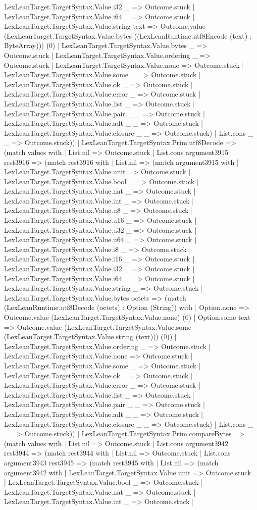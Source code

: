 \documentclass[11pt]{article}
\begin{document}
LexLeanTarget.TargetSyntax.Value.i32 \_ => Outcome.stuck | LexLeanTarget.TargetSyntax.Value.i64 \_ => Outcome.stuck | LexLeanTarget.TargetSyntax.Value.string text => Outcome.value (LexLeanTarget.TargetSyntax.Value.bytes ((LexLeanRuntime.utf8Encode (text) : ByteArray))) (0) | LexLeanTarget.TargetSyntax.Value.bytes \_ => Outcome.stuck | LexLeanTarget.TargetSyntax.Value.ordering \_ => Outcome.stuck | LexLeanTarget.TargetSyntax.Value.none => Outcome.stuck | LexLeanTarget.TargetSyntax.Value.some \_ => Outcome.stuck | LexLeanTarget.TargetSyntax.Value.ok \_ => Outcome.stuck | LexLeanTarget.TargetSyntax.Value.error \_ => Outcome.stuck | LexLeanTarget.TargetSyntax.Value.list \_ => Outcome.stuck | LexLeanTarget.TargetSyntax.Value.pair \_ \_ => Outcome.stuck | LexLeanTarget.TargetSyntax.Value.adt \_ \_ => Outcome.stuck | LexLeanTarget.TargetSyntax.Value.closure \_ \_ => Outcome.stuck) | List.cons \_ \_ => Outcome.stuck)) | LexLeanTarget.TargetSyntax.Prim.utf8Decode => (match values with | List.nil => Outcome.stuck | List.cons argument3915 rest3916 => (match rest3916 with | List.nil => (match argument3915 with | LexLeanTarget.TargetSyntax.Value.unit => Outcome.stuck | LexLeanTarget.TargetSyntax.Value.bool \_ => Outcome.stuck | LexLeanTarget.TargetSyntax.Value.nat \_ => Outcome.stuck | LexLeanTarget.TargetSyntax.Value.int \_ => Outcome.stuck | LexLeanTarget.TargetSyntax.Value.u8 \_ => Outcome.stuck | LexLeanTarget.TargetSyntax.Value.u16 \_ => Outcome.stuck | LexLeanTarget.TargetSyntax.Value.u32 \_ => Outcome.stuck | LexLeanTarget.TargetSyntax.Value.u64 \_ => Outcome.stuck | LexLeanTarget.TargetSyntax.Value.i8 \_ => Outcome.stuck | LexLeanTarget.TargetSyntax.Value.i16 \_ => Outcome.stuck | LexLeanTarget.TargetSyntax.Value.i32 \_ => Outcome.stuck | LexLeanTarget.TargetSyntax.Value.i64 \_ => Outcome.stuck | LexLeanTarget.TargetSyntax.Value.string \_ => Outcome.stuck | LexLeanTarget.TargetSyntax.Value.bytes octets => (match (LexLeanRuntime.utf8Decode (octets) : Option (String)) with | Option.none => Outcome.value (LexLeanTarget.TargetSyntax.Value.none) (0) | Option.some text => Outcome.value (LexLeanTarget.TargetSyntax.Value.some (LexLeanTarget.TargetSyntax.Value.string (text))) (0)) | LexLeanTarget.TargetSyntax.Value.ordering \_ => Outcome.stuck | LexLeanTarget.TargetSyntax.Value.none => Outcome.stuck | LexLeanTarget.TargetSyntax.Value.some \_ => Outcome.stuck | LexLeanTarget.TargetSyntax.Value.ok \_ => Outcome.stuck | LexLeanTarget.TargetSyntax.Value.error \_ => Outcome.stuck | LexLeanTarget.TargetSyntax.Value.list \_ => Outcome.stuck | LexLeanTarget.TargetSyntax.Value.pair \_ \_ => Outcome.stuck | LexLeanTarget.TargetSyntax.Value.adt \_ \_ => Outcome.stuck | LexLeanTarget.TargetSyntax.Value.closure \_ \_ => Outcome.stuck) | List.cons \_ \_ => Outcome.stuck)) | LexLeanTarget.TargetSyntax.Prim.compareBytes => (match values with | List.nil => Outcome.stuck | List.cons argument3942 rest3944 => (match rest3944 with | List.nil => Outcome.stuck | List.cons argument3943 rest3945 => (match rest3945 with | List.nil => (match argument3942 with | LexLeanTarget.TargetSyntax.Value.unit => Outcome.stuck | LexLeanTarget.TargetSyntax.Value.bool \_ => Outcome.stuck | LexLeanTarget.TargetSyntax.Value.nat \_ => Outcome.stuck | LexLeanTarget.TargetSyntax.Value.int \_ => Outcome.stuck | 
\end{document}
